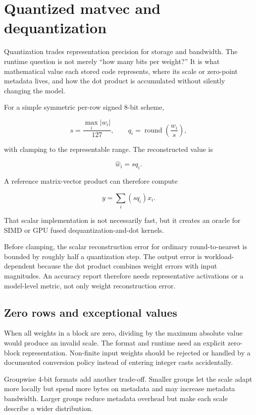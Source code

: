 \hypertarget{appendix-241c0e42ac2d}{}\label{referencestart:appendix-241c0e42ac2d}
\section{Quantized matvec and dequantization}\label{appendix-241c0e42ac2d-quantized-matvec-and-dequantization}

Quantization trades representation precision for storage and bandwidth. The runtime question is not merely ``how many bits per weight?'' It is what mathematical value each stored code represents, where its scale or zero-point metadata lives, and how the dot product is accumulated without silently changing the model.

For a simple symmetric per-row signed 8-bit scheme,

\[
s = \frac{\max_i |w_i|}{127},
\qquad
q_i = \operatorname{round}\!\left(\frac{w_i}{s}\right),
\]

with clamping to the representable range. The reconstructed value is

\[
\hat w_i = s q_i.
\]

A reference matrix-vector product can therefore compute

\[
y = \sum_i (s q_i)x_i.
\]

That scalar implementation is not necessarily fast, but it creates an oracle for SIMD or GPU fused dequantization-and-dot kernels.

Before clamping, the scalar reconstruction error for ordinary round-to-nearest is bounded by roughly half a quantization step. The output error is workload-dependent because the dot product combines weight errors with input magnitudes. An accuracy report therefore needs representative activations or a model-level metric, not only weight reconstruction error.

\subsection{Zero rows and exceptional values}\label{appendix-241c0e42ac2d-zero-rows-and-exceptional-values}

When all weights in a block are zero, dividing by the maximum absolute value would produce an invalid scale. The format and runtime need an explicit zero-block representation. Non-finite input weights should be rejected or handled by a documented conversion policy instead of entering integer casts accidentally.

Groupwise 4-bit formats add another trade-off. Smaller groups let the scale adapt more locally but spend more bytes on metadata and may increase metadata bandwidth. Larger groups reduce metadata overhead but make each scale describe a wider distribution.

